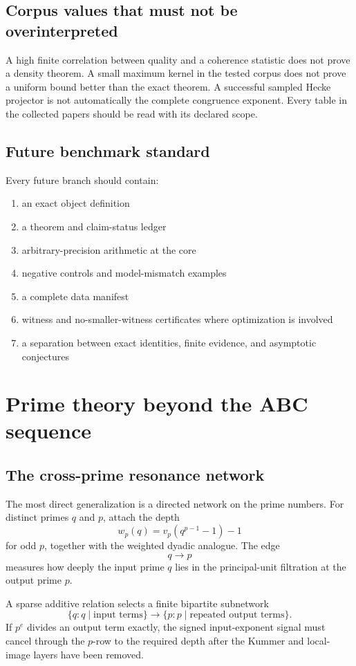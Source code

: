 \section{Corpus values that must not be overinterpreted}
A high finite correlation between quality and a coherence statistic does not prove a density theorem. A small maximum kernel in the tested corpus does not prove a uniform bound better than the exact theorem. A successful sampled Hecke projector is not automatically the complete congruence exponent. Every table in the collected papers should be read with its declared scope.

\section{Future benchmark standard}
Every future branch should contain:
\begin{enumerate}[leftmargin=1.5em]
\item an exact object definition
\item a theorem and claim-status ledger
\item arbitrary-precision arithmetic at the core
\item negative controls and model-mismatch examples
\item a complete data manifest
\item witness and no-smaller-witness certificates where optimization is involved
\item a separation between exact identities, finite evidence, and asymptotic conjectures
\end{enumerate}

\chapter{Prime theory beyond the ABC sequence}

\section{The cross-prime resonance network}
The most direct generalization is a directed network on the prime numbers. For distinct primes $q$ and $p$, attach the depth
\[
\boxed{
w_p(q)=v_p(q^{p-1}-1)-1
}
\]
for odd $p$, together with the weighted dyadic analogue. The edge
\[
q\longrightarrow p
\]
measures how deeply the input prime $q$ lies in the principal-unit filtration at the output prime $p$.

A sparse additive relation selects a finite bipartite subnetwork
\[
\{q:q\mid\text{input terms}\}
\longrightarrow
\{p:p\mid\text{repeated output terms}\}.
\]
If $p^e$ divides an output term exactly, the signed input-exponent signal must cancel through the $p$-row to the required depth after the Kummer and local-image layers have been removed.

